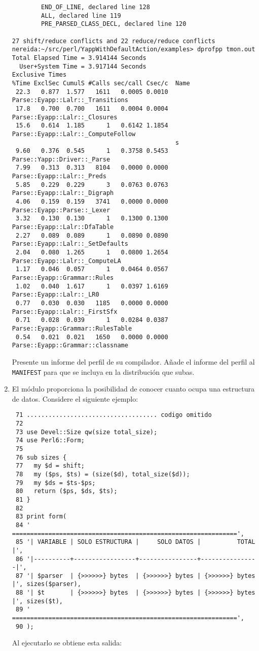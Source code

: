 \begin{enumerate}
\begin{verbatim}
        END_OF_LINE, declared line 128
        ALL, declared line 119
        PRE_PARSED_CLASS_DECL, declared line 120

27 shift/reduce conflicts and 22 reduce/reduce conflicts
nereida:~/src/perl/YappWithDefaultAction/examples> dprofpp tmon.out
Total Elapsed Time = 3.914144 Seconds
  User+System Time = 3.917144 Seconds
Exclusive Times
%Time ExclSec CumulS #Calls sec/call Csec/c  Name
 22.3   0.877  1.577   1611   0.0005 0.0010  Parse::Eyapp::Lalr::_Transitions
 17.8   0.700  0.700   1611   0.0004 0.0004  Parse::Eyapp::Lalr::_Closures
 15.6   0.614  1.185      1   0.6142 1.1854  Parse::Eyapp::Lalr::_ComputeFollow
                                             s
 9.60   0.376  0.545      1   0.3758 0.5453  Parse::Yapp::Driver::_Parse
 7.99   0.313  0.313   8104   0.0000 0.0000  Parse::Eyapp::Lalr::_Preds
 5.85   0.229  0.229      3   0.0763 0.0763  Parse::Eyapp::Lalr::_Digraph
 4.06   0.159  0.159   3741   0.0000 0.0000  Parse::Eyapp::Parse::_Lexer
 3.32   0.130  0.130      1   0.1300 0.1300  Parse::Eyapp::Lalr::DfaTable
 2.27   0.089  0.089      1   0.0890 0.0890  Parse::Eyapp::Lalr::_SetDefaults
 2.04   0.080  1.265      1   0.0800 1.2654  Parse::Eyapp::Lalr::_ComputeLA
 1.17   0.046  0.057      1   0.0464 0.0567  Parse::Eyapp::Grammar::Rules
 1.02   0.040  1.617      1   0.0397 1.6169  Parse::Eyapp::Lalr::_LR0
 0.77   0.030  0.030   1185   0.0000 0.0000  Parse::Eyapp::Lalr::_FirstSfx
 0.71   0.028  0.039      1   0.0284 0.0387  Parse::Eyapp::Grammar::RulesTable
 0.54   0.021  0.021   1650   0.0000 0.0000  Parse::Eyapp::Grammar::classname
\end{verbatim}

Presente un informe del perfil de su compilador. 
Añade el informe del perfil al \verb|MANIFEST| para que se incluya en la distribución 
que subas.

\item
El módulo  proporciona la posibilidad de
conocer cuanto ocupa una estructura de datos. Considere el siguiente
ejemplo:
\begin{verbatim}
 71 .................................... codigo omitido
 72
 73 use Devel::Size qw(size total_size);
 74 use Perl6::Form;
 75
 76 sub sizes {
 77   my $d = shift;
 78   my ($ps, $ts) = (size($d), total_size($d));
 79   my $ds = $ts-$ps;
 80   return ($ps, $ds, $ts);
 81 }
 82
 83 print form(
 84 ' ==============================================================',
 85 '| VARIABLE | SOLO ESTRUCTURA |     SOLO DATOS |          TOTAL |',
 86 '|----------+-----------------+----------------+----------------|',
 87 '| $parser  | {>>>>>>} bytes  | {>>>>>>} bytes | {>>>>>>} bytes |', sizes($parser),
 88 '| $t       | {>>>>>>} bytes  | {>>>>>>} bytes | {>>>>>>} bytes |', sizes($t),
 89 ' ==============================================================',
 90 );
\end{verbatim}
Al ejecutarlo se obtiene esta salida:


\end{enumerate}
